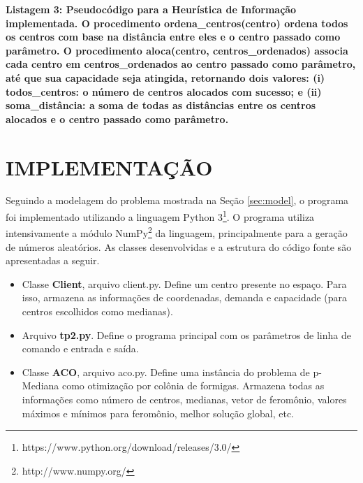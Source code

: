 \documentclass[12pt]{article}
\begin{document}
\begin{mdframed}[linecolor=black, leftline=false, rightline=false]
    \inputminted[linenos, fontsize=\footnotesize]{text}{infheur.txt}
\end{mdframed}

\begin{center}
 \textbf{Listagem 3: Pseudocódigo para a Heurística de Informação implementada. O procedimento
 ordena\_centros(centro) ordena todos os centros com base na distância entre eles e o centro passado
 como parâmetro. O procedimento aloca(centro, centros\_ordenados) associa cada centro em centros\_ordenados
 ao centro passado como parâmetro, até que sua capacidade seja atingida, retornando dois valores: (i) todos\_centros:
 o número de centros alocados com sucesso; e (ii) soma\_distância: a soma de todas as distâncias entre os centros
 alocados e o centro passado como parâmetro.}
\end{center}

\section{IMPLEMENTAÇÃO}

Seguindo a modelagem do problema mostrada na Seção \ref{sec:model}, o programa foi implementado
utilizando a linguagem Python 3\footnote{https://www.python.org/download/releases/3.0/}. O programa
utiliza intensivamente a módulo NumPy\footnote{http://www.numpy.org/} da linguagem,
principalmente para a geração de números aleatórios. As classes desenvolvidas
e a estrutura do código fonte são apresentadas a seguir.

\begin{itemize}
 \item Classe \textbf{Client}, arquivo client.py. Define um centro presente no espaço. Para isso,
 armazena as informações de coordenadas, demanda e capacidade (para centros escolhidos como medianas).
 
 \item Arquivo \textbf{tp2.py}. Define o programa principal com os parâmetros de linha de comando e
 entrada e saída.
 
 \item Classe \textbf{ACO}, arquivo aco.py. Define uma instância do problema de p-Mediana como otimização
 por colônia de formigas. Armazena todas as informações como número de centros, medianas, vetor de feromônio,
 valores máximos e mínimos para feromônio, melhor solução global, etc.
\end{itemize}
\end{document}
